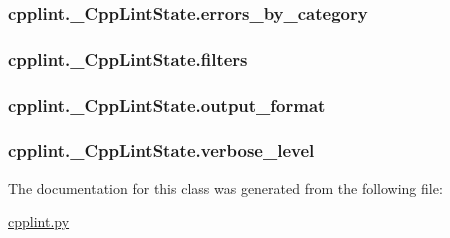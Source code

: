 \subsubsection[{\texorpdfstring{errors\+\_\+by\+\_\+category}{errors_by_category}}]{\setlength{\rightskip}{0pt plus 5cm}cpplint.\+\_\+\+Cpp\+Lint\+State.\+errors\+\_\+by\+\_\+category}\hypertarget{classcpplint_1_1__CppLintState_afb33527113706b5fcae07d680d8cec99}{}\label{classcpplint_1_1__CppLintState_afb33527113706b5fcae07d680d8cec99}
\subsubsection[{\texorpdfstring{filters}{filters}}]{\setlength{\rightskip}{0pt plus 5cm}cpplint.\+\_\+\+Cpp\+Lint\+State.\+filters}\hypertarget{classcpplint_1_1__CppLintState_a8443105b9623383ab75fa242009c006e}{}\label{classcpplint_1_1__CppLintState_a8443105b9623383ab75fa242009c006e}
\subsubsection[{\texorpdfstring{output\+\_\+format}{output_format}}]{\setlength{\rightskip}{0pt plus 5cm}cpplint.\+\_\+\+Cpp\+Lint\+State.\+output\+\_\+format}\hypertarget{classcpplint_1_1__CppLintState_a5c68ca79b0ff9b2fba1c488a7b2bd3f0}{}\label{classcpplint_1_1__CppLintState_a5c68ca79b0ff9b2fba1c488a7b2bd3f0}
\subsubsection[{\texorpdfstring{verbose\+\_\+level}{verbose_level}}]{\setlength{\rightskip}{0pt plus 5cm}cpplint.\+\_\+\+Cpp\+Lint\+State.\+verbose\+\_\+level}\hypertarget{classcpplint_1_1__CppLintState_a94328754c2f7481f4da9757a9dede308}{}\label{classcpplint_1_1__CppLintState_a94328754c2f7481f4da9757a9dede308}


The documentation for this class was generated from the following file\+:\begin{DoxyCompactItemize}
\item 
\hyperlink{cpplint_8py}{cpplint.\+py}\end{DoxyCompactItemize}
